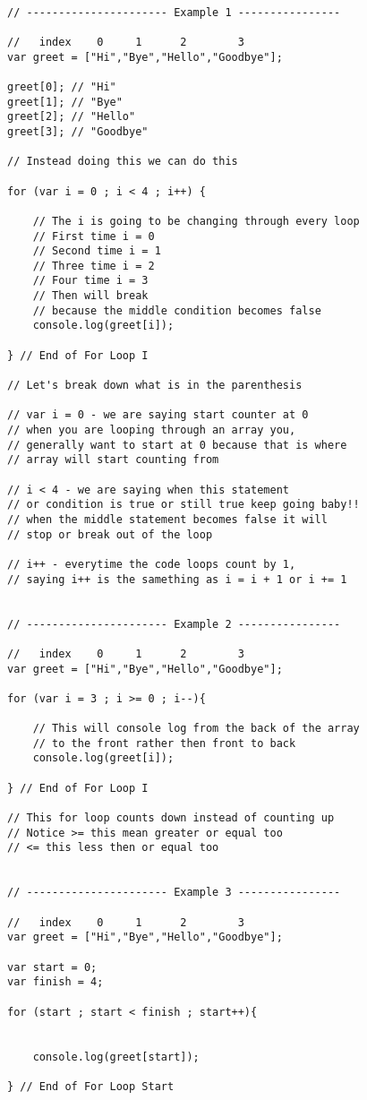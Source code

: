\documentclass[12pt, letterpaper]{article}
\begin{document}
\begin{lstlisting}

// ---------------------- Example 1 ----------------

//   index    0     1      2        3
var greet = ["Hi","Bye","Hello","Goodbye"];

greet[0]; // "Hi"
greet[1]; // "Bye"
greet[2]; // "Hello"
greet[3]; // "Goodbye"

// Instead doing this we can do this

for (var i = 0 ; i < 4 ; i++) {

	// The i is going to be changing through every loop
	// First time i = 0
	// Second time i = 1
	// Three time i = 2
	// Four time i = 3
	// Then will break
	// because the middle condition becomes false 
	console.log(greet[i]);

} // End of For Loop I

// Let's break down what is in the parenthesis

// var i = 0 - we are saying start counter at 0 
// when you are looping through an array you,
// generally want to start at 0 because that is where
// array will start counting from

// i < 4 - we are saying when this statement 
// or condition is true or still true keep going baby!!
// when the middle statement becomes false it will
// stop or break out of the loop

// i++ - everytime the code loops count by 1,
// saying i++ is the samething as i = i + 1 or i += 1 


// ---------------------- Example 2 ----------------

//   index    0     1      2        3
var greet = ["Hi","Bye","Hello","Goodbye"];

for (var i = 3 ; i >= 0 ; i--){

	// This will console log from the back of the array
	// to the front rather then front to back
	console.log(greet[i]);

} // End of For Loop I

// This for loop counts down instead of counting up
// Notice >= this mean greater or equal too
// <= this less then or equal too


// ---------------------- Example 3 ----------------

//   index    0     1      2        3
var greet = ["Hi","Bye","Hello","Goodbye"];

var start = 0;
var finish = 4;

for (start ; start < finish ; start++){


	console.log(greet[start]);

} // End of For Loop Start


\end{lstlisting}
\end{document}
